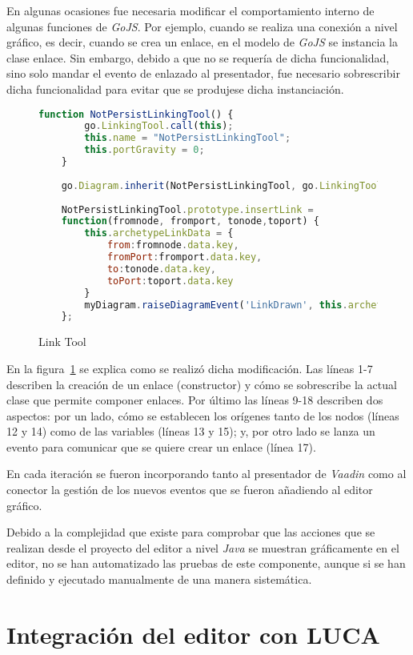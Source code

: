 En algunas ocasiones fue necesaria  modificar el comportamiento interno de algunas funciones de \emph{GoJS}. Por ejemplo, cuando se realiza una conexión a nivel gráfico, es decir, cuando se crea un enlace, en el modelo de \emph{GoJS} se instancia la clase enlace. Sin embargo, debido a que no se requería de dicha funcionalidad,  sino solo mandar el evento de enlazado al presentador, fue necesario sobrescribir dicha funcionalidad para evitar que se produjese dicha instanciación.


\begin{figure}[H]
	\centering
	\begin{lstlisting}[language=Javascript]
	function NotPersistLinkingTool() {
		go.LinkingTool.call(this);
		this.name = "NotPersistLinkingTool";
		this.portGravity = 0;
	}
	
	go.Diagram.inherit(NotPersistLinkingTool, go.LinkingTool);
	
	NotPersistLinkingTool.prototype.insertLink =
	function(fromnode, fromport, tonode,toport) {
		this.archetypeLinkData = {
			from:fromnode.data.key,
			fromPort:fromport.data.key,
			to:tonode.data.key,
			toPort:toport.data.key
		}
		myDiagram.raiseDiagramEvent('LinkDrawn', this.archetypeLinkData);
	};\end{lstlisting}
	\caption{Link Tool}
	\label{fig:linkTool}
\end{figure}


En la figura~\ref{fig:linkTool} se explica como se realizó dicha modificación. Las líneas 1-7 describen la creación de un enlace (constructor) y cómo se sobrescribe la actual clase que permite componer enlaces. Por último las líneas 9-18 describen dos aspectos: por un lado, cómo se establecen los orígenes tanto de los nodos (líneas 12 y 14) como de las variables (líneas 13 y 15); y, por otro lado se lanza un evento para comunicar que se quiere crear un enlace (línea 17).

En cada iteración se fueron incorporando tanto al presentador de \emph{Vaadin} como al conector la gestión de los nuevos eventos que se fueron añadiendo al editor gráfico.

Debido a la complejidad que existe para comprobar que las acciones que se realizan desde el proyecto del editor a nivel \emph{Java} se muestran gráficamente en el editor, no se han automatizado las pruebas de este componente, aunque si se han definido y ejecutado manualmente de una manera sistemática. 

\section{Integración del editor con LUCA}

